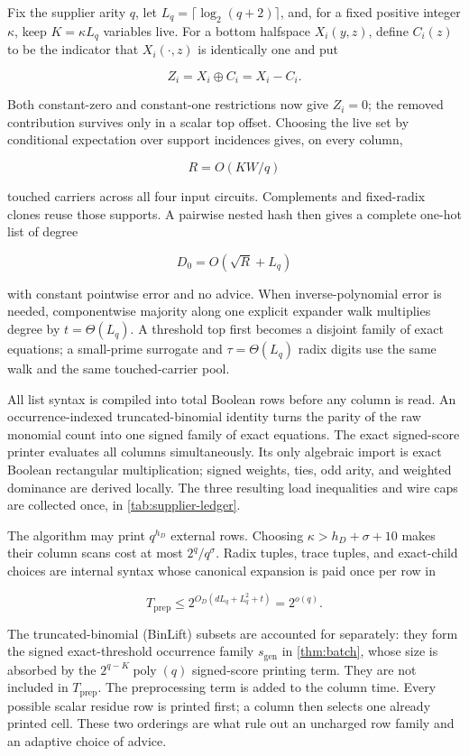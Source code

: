 \documentclass[11pt,letterpaper]{article}
\newcommand{\cref}[1]{\ref{#1}}
\theoremstyle{definition}
\theoremstyle{remark}
\newcommand{\poly}{\operatorname{poly}}
\begin{document}
Fix the supplier arity \(q\), let \(L_q=\lceil\log_2(q+2)\rceil\), and,
for a fixed positive integer \(\kappa\), keep \(K=\kappa L_q\) variables
live. For a bottom halfspace
\(X_i(y,z)\), define \(C_i(z)\) to be the indicator that
\(X_i(\cdot,z)\) is identically one and put

\[
Z_i=X_i\oplus C_i=X_i-C_i.
\]

Both constant-zero and constant-one restrictions now give \(Z_i=0\); the
removed contribution survives only in a scalar top offset. Choosing the
live set by conditional expectation over support incidences gives, on
every column,

\[
R=O(KW/q)
\]

touched carriers across all four input circuits. Complements and
fixed-radix clones reuse those supports. A pairwise nested hash then
gives a complete one-hot list of degree

\[
D_0=O(\sqrt R+L_q)
\]

with constant pointwise error and no advice. When inverse-polynomial
error is needed, componentwise majority along one explicit expander walk
multiplies degree by \(t=\Theta(L_q)\). A threshold top first becomes a
disjoint family of exact equations; a small-prime surrogate and
\(\tau=\Theta(L_q)\) radix digits use the same walk and the same
touched-carrier pool.

All list syntax is compiled into total Boolean rows before any column is
read. An occurrence-indexed truncated-binomial identity turns the parity
of the raw monomial count into one signed family of exact equations. The
exact signed-score printer evaluates all columns simultaneously. Its
only algebraic import is exact Boolean rectangular multiplication;
signed weights, ties, odd arity, and weighted dominance are derived
locally. The three resulting load inequalities and wire caps are collected
once, in \cref{tab:supplier-ledger}.

The algorithm may print \(q^{h_D}\) external rows. Choosing
\(\kappa>h_D+\sigma+10\) makes their column scans cost at most
\(2^q/q^\sigma\). Radix tuples, trace tuples, and exact-child choices are
internal syntax whose canonical expansion is paid once per row in

\[
T_{\mathrm{prep}}
\le
2^{O_D(dL_q+L_q^2+t)}
{}={}
2^{o(q)}.
\]

The truncated-binomial (BinLift) subsets are accounted for separately: they
form the signed exact-threshold occurrence family \(s_{\mathrm{gen}}\) in
\cref{thm:batch}, whose size is absorbed by the
\(2^{q-K}\poly(q)\) signed-score printing term. They are not included in
\(T_{\mathrm{prep}}\). The preprocessing term is added to the column time.
Every possible scalar
residue row is printed first; a column then selects one already printed
cell. These two orderings are what rule out an uncharged row family and
an adaptive choice of advice.
\end{document}
